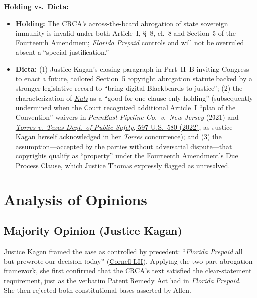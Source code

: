 \documentclass[12pt]{article}
\begin{document}
\textbf{Holding vs.\ Dicta:}
\begin{itemize}
  \item \textbf{Holding:} The CRCA's across-the-board abrogation of state sovereign immunity is invalid under both Article~I, \S~8, cl.\ 8 and Section~5 of the Fourteenth Amendment; \textit{Florida Prepaid} controls and will not be overruled absent a ``special justification.''
  \item \textbf{Dicta:} (1) Justice Kagan's closing paragraph in Part~II--B inviting Congress to enact a future, tailored Section~5 copyright abrogation statute backed by a stronger legislative record to ``bring digital Blackbeards to justice''; (2) the characterization of \href{https://supreme.justia.com/cases/federal/us/546/356/}{\textit{Katz}} as a ``good-for-one-clause-only holding'' (subsequently undermined when the Court recognized additional Article~I ``plan of the Convention'' waivers in \textit{PennEast Pipeline Co.\ v.\ New Jersey} (2021) and \href{https://supreme.justia.com/cases/federal/us/597/20-603/}{\textit{Torres v.\ Texas Dept.\ of Public Safety}, 597 U.S.\ 580 (2022)}, as Justice Kagan herself acknowledged in her \textit{Torres} concurrence); and (3) the assumption---accepted by the parties without adversarial dispute---that copyrights qualify as ``property'' under the Fourteenth Amendment's Due Process Clause, which Justice Thomas expressly flagged as unresolved.
\end{itemize}

\section{Analysis of Opinions}

\subsection{Majority Opinion (Justice Kagan)}
Justice Kagan framed the case as controlled by precedent: ``\textit{Florida Prepaid} all but prewrote our decision today'' (\href{https://www.law.cornell.edu/supremecourt/text/18-877}{Cornell LII}). Applying the two-part abrogation framework, she first confirmed that the CRCA's text satisfied the clear-statement requirement, just as the verbatim Patent Remedy Act had in \href{https://supreme.justia.com/cases/federal/us/527/627/}{\textit{Florida Prepaid}}. She then rejected both constitutional bases asserted by Allen.
\end{document}
